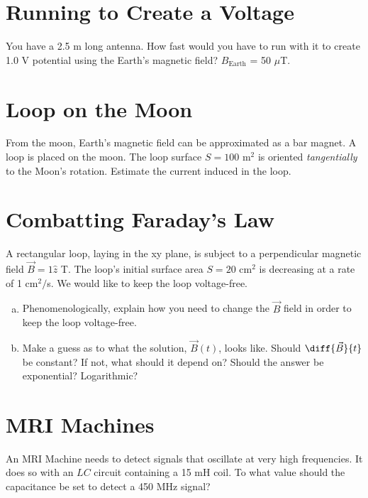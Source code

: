 \documentclass[12pt]{article}
\begin{document}
\vspace{1in}
\section{Running to Create a Voltage}
You have a 2.5 m long antenna. How fast would you have to run with it to create 1.0 V potential using the Earth's magnetic field? $B_{\mathrm{Earth}}$ =  50 $\mu$T. 


\newpage
\section{Loop on the Moon}

From the moon, Earth's magnetic field can be approximated as a bar magnet. A loop is placed on the moon. The loop surface $S = 100$ m$^2$ is oriented \emph{tangentially} to the Moon's rotation. Estimate the current induced in the loop.
\vspace{2.5in}
\section{Combatting Faraday's Law}
A rectangular loop, laying in the xy plane, is subject to a perpendicular magnetic field $\vec{B} = 1 \hat{z}$ T. The loop's initial surface area $S = 20$ cm$^2$ is decreasing at a rate of 1 cm$^2/$s. We would like to keep the loop voltage-free. 

\begin{enumerate}[(a)]
	\item Phenomenologically, explain how you need to change the $\vec{B}$ field in order to keep the loop voltage-free.
	\item Make a guess as to what the solution, $\vec{B}(t)$, looks like. Should $\diff{\vec{B}}{t}$ be constant? If not, what should it depend on? Should the answer be exponential? Logarithmic? 
\end{enumerate}

\newpage
\section{MRI Machines}

An MRI Machine needs to detect signals that oscillate at very high frequencies. It does so with an $LC$ circuit containing a 15 mH coil. To what value should the capacitance be set to detect a 450 MHz signal?
\end{document}

